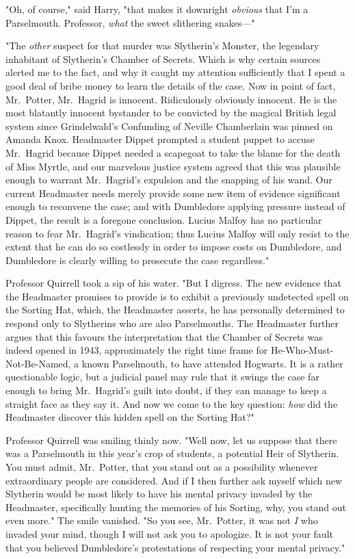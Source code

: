 "Oh, of course," said Harry, "that makes it downright \emph{obvious} that I'm a
Parselmouth. Professor, \emph{what} the sweet slithering snakes---"

"The \emph{other} suspect for that murder was Slytherin's Monster, the
legendary inhabitant of Slytherin's Chamber of Secrets. Which is why certain
sources alerted me to the fact, and why it caught my attention sufficiently
that I spent a good deal of bribe money to learn the details of the case. Now
in point of fact, Mr.~Potter, Mr.~Hagrid is innocent. Ridiculously obviously
innocent. He is the most blatantly innocent bystander to be convicted by the
magical British legal system since Grindelwald's Confunding of Neville
Chamberlain was pinned on Amanda Knox. Headmaster Dippet prompted a student
puppet to accuse Mr.~Hagrid because Dippet needed a scapegoat to take the blame
for the death of Miss Myrtle, and our marvelous justice system agreed that this
was plausible enough to warrant Mr.~Hagrid's expulsion and the snapping of his
wand. Our current Headmaster needs merely provide some new item of evidence
significant enough to reconvene the case; and with Dumbledore applying pressure
instead of Dippet, the result is a foregone conclusion. Lucius Malfoy has no
particular reason to fear Mr.~Hagrid's vindication; thus Lucius Malfoy will
only resist to the extent that he can do so costlessly in order to impose costs
on Dumbledore, and Dumbledore is clearly willing to prosecute the case
regardless."

Professor Quirrell took a sip of his water. "But I digress. The new evidence
that the Headmaster promises to provide is to exhibit a previously undetected
spell on the Sorting Hat, which, the Headmaster asserts, he has personally
determined to respond only to Slytherins who are also Parselmouths. The
Headmaster further argues that this favours the interpretation that the Chamber
of Secrets was indeed opened in 1943, approximately the right time frame for
He-Who-Must-Not-Be-Named, a known Parselmouth, to have attended Hogwarts. It is
a rather questionable logic, but a judicial panel may rule that it swings the
case far enough to bring Mr.~Hagrid's guilt into doubt, if they can manage to
keep a straight face as they say it. And now we come to the key question:
\emph{how} did the Headmaster discover this hidden spell on the Sorting Hat?"

Professor Quirrell was smiling thinly now. "Well now, let us suppose that there
was a Parselmouth in this year's crop of students, a potential Heir of
Slytherin. You must admit, Mr.~Potter, that you stand out as a possibility
whenever extraordinary people are considered. And if I then further ask myself
which new Slytherin would be most likely to have his mental privacy invaded by
the Headmaster, specifically hunting the memories of his Sorting, why, you
stand out even more." The smile vanished. "So you see, Mr.~Potter, it was not
\emph{I} who invaded your mind, though I will not ask you to apologize. It is
not your fault that you believed Dumbledore's protestations of respecting your
mental privacy."

